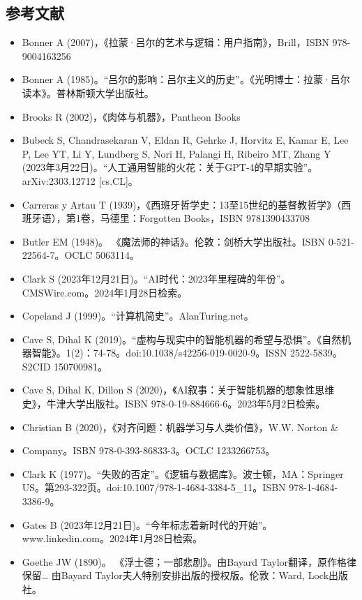 \subsection{参考文献} 
\begin{itemize}
\item Bonner A (2007)，《拉蒙·吕尔的艺术与逻辑：用户指南》，Brill，ISBN 978-9004163256  
\item Bonner A (1985)。“吕尔的影响：吕尔主义的历史”。《光明博士：拉蒙·吕尔读本》。普林斯顿大学出版社。  
\item Brooks R (2002)，《肉体与机器》，Pantheon Books  
\item Bubeck S, Chandrasekaran V, Eldan R, Gehrke J, Horvitz E, Kamar E, Lee P, Lee YT, Li Y, Lundberg S, Nori H, Palangi H, Ribeiro MT, Zhang Y (2023年3月22日)。“人工通用智能的火花：关于GPT-4的早期实验”。arXiv:2303.12712 [cs.CL]。  
\item Carreras y Artau T (1939)，《西班牙哲学史：13至15世纪的基督教哲学》（西班牙语），第1卷，马德里：Forgotten Books，ISBN 9781390433708  
\item Butler EM (1948)。 《魔法师的神话》。伦敦：剑桥大学出版社。ISBN 0-521-22564-7。OCLC 5063114。  
\item Clark S (2023年12月21日)。“AI时代：2023年里程碑的年份”。CMSWire.com。2024年1月28日检索。  
\item Copeland J (1999)。“计算机简史”。AlanTuring.net。  
\item Cave S, Dihal K (2019)。“虚构与现实中的智能机器的希望与恐惧”。《自然机器智能》。1(2)：74-78。doi:10.1038/s42256-019-0020-9。ISSN 2522-5839。S2CID 150700981。  
\item Cave S, Dihal K, Dillon S (2020)，《AI叙事：关于智能机器的想象性思维史》，牛津大学出版社。ISBN 978-0-19-884666-6。2023年5月2日检索。  
\item Christian B (2020)，《对齐问题：机器学习与人类价值》，W.W. Norton & \item Company。ISBN 978-0-393-86833-3。OCLC 1233266753。  
\item Clark K (1977)。“失败的否定”。《逻辑与数据库》。波士顿，MA：Springer US。第293-322页。doi:10.1007/978-1-4684-3384-5_11。ISBN 978-1-4684-3386-9。  
\item Gates B (2023年12月21日)。“今年标志着新时代的开始”。www.linkedin.com。2024年1月28日检索。  
\item Goethe JW (1890)。 《浮士德；一部悲剧》。由Bayard Taylor翻译，原作格律保留… 由Bayard Taylor夫人特别安排出版的授权版。伦敦：Ward, Lock出版社。
\end{itemize}